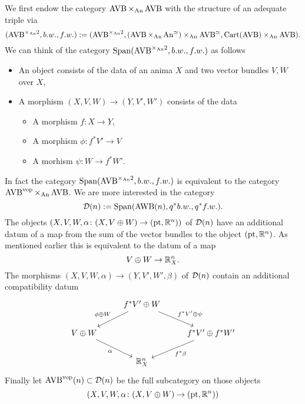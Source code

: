 \begin{construction}
    We first endow the category $\operatorname{AVB} \times_{\operatorname{An}} \operatorname{AVB}$ with the structure of an 
    adequate triple via 
    \small
    \[
      (\operatorname{AVB}^{\times_{\operatorname{An}} 2}, b.w., f.w.) := (
        \operatorname{AVB}^{\times_{\operatorname{An}} 2}, (\operatorname{AVB} \times_{\operatorname{An}} \operatorname{An}^\simeq ) \times_{\operatorname{An}} \operatorname{AVB}^\simeq, 
        \mathrm{Cart}(\operatorname{AVB}) \times_{\operatorname{An}} \operatorname{AVB}) . 
    \]
    \normalsize
    We can think of the category $\mathrm{Span}(\operatorname{AVB}^{\times_{\operatorname{An}} 2}, b.w., f.w.)$
    as follows 
    \begin{itemize}
        \item An object consists of the data of an anima $X$ and two vector bundles $V,W$ 
        over $X$, 
        \item A morphism $(X,V,W) \to (Y,V',W')$ consists of the data
        \begin{itemize}
            \item A morphism $f \colon X \to Y$, 
            \item A morphism $\phi \colon f^*V' \to V$
            \item A morhism $\psi \colon W \to f^*W'$.
        \end{itemize}
    \end{itemize}
    In fact the category $\mathrm{Span}(\operatorname{AVB}^{\times_{\operatorname{An}} 2}, b.w., f.w.)$ is equivalent to 
    the category $\operatorname{AVB}^{\mathrm{vop}}\times_{\operatorname{An}}\operatorname{AVB}$. 
    We are more interested in the category 
    \[ 
        \mathcal{D}(n) := \mathrm{Span}(\operatorname{AWB}(n), q^*b.w., q^*f.w.).
    \]
    The objects $(X,V, W, \alpha \colon (X, V \oplus W) \to (\mathrm{pt}, \mathbb{R}^n))$ of $\mathcal{D}(n)$ have an 
    additional datum of a map from the sum of the vector bundles to the object $(\mathrm{pt}, \mathbb{R}^n)$.
    As mentioned earlier this is equivalent to the datum of a map 
    \[
    V \oplus W \to \mathbb{R}^n_X .  
    \]
    The morphisms $(X, V, W, \alpha) \to (Y, V', W', \beta)$ of $\mathcal{D}(n)$ contain an additional 
    compatibility datum 
    \[\begin{tikzcd}
        & {f^*V' \oplus W} \\
        {V\oplus W} && {f^*V' \oplus f^*W'} \\
        & {\R^n_X}
        \arrow["{\phi \oplus W}"', from=1-2, to=2-1]
        \arrow["{f^*V' \oplus\psi}", from=1-2, to=2-3]
        \arrow["\alpha"', from=2-1, to=3-2]
        \arrow["{f^*\beta}", from=2-3, to=3-2]
    \end{tikzcd}\]
    Finally let $\operatorname{AVB}^{\mathrm{vop}}(n) \subset \mathcal{D}(n)$ be the full subcategory on those objects 
    \[
        (X,V,W,\alpha \colon (X, V \oplus W) \to (\mathrm{pt}, \mathbb{R}^n))  
\]
\end{construction}
